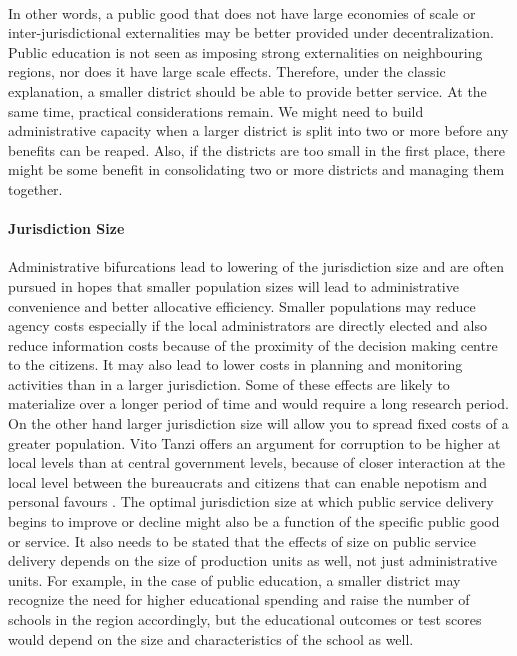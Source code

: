 \documentclass[12pt, a4paper]{article}
\begin{document}
\paragraph{} In other words, a public good that does not have large economies of scale or inter-jurisdictional externalities may be better provided under decentralization. Public education is not seen as imposing strong externalities on neighbouring regions, nor does it have large scale effects. Therefore, under the classic explanation, a smaller district should be able to provide better service. At the same time, practical considerations remain. We might need to build administrative capacity when a larger district is split into two or more before any benefits can be reaped. Also, if the districts are too small in the first place, there might be some benefit in consolidating two or more districts and managing them together.  

\paragraph{Jurisdiction Size} Administrative bifurcations lead to lowering of the jurisdiction size and are often pursued in hopes that smaller population sizes will lead to administrative convenience and better allocative efficiency. Smaller populations may reduce agency costs especially if the local administrators are directly elected and also reduce information costs because of the proximity of the decision making centre to the citizens. It may also lead to lower costs in planning and monitoring activities than in a larger jurisdiction. Some of these effects are likely to materialize over a longer period of time and would require a long research period. On the other hand larger jurisdiction size will allow you to spread fixed costs of a greater population. Vito Tanzi offers an argument for corruption to be higher at local levels than at central government levels, because of closer interaction at the local level between the bureaucrats and citizens that can enable nepotism and personal favours \parencite{tanzi1996macroeconomic}. \nocite{allers2016effects} \nocite{lassen_jurisdiction_2011} The optimal jurisdiction size at which public service delivery begins to improve or decline might also be a function of the specific public good or service. It also needs to be stated that the effects of size on public service delivery depends on the size of production units as well, not just administrative units. For example, in the case of public education, a smaller district may recognize the need for higher educational spending and raise the number of schools in the region accordingly, but the educational outcomes or test scores would depend on the size and characteristics of the school as well. 
\end{document}
